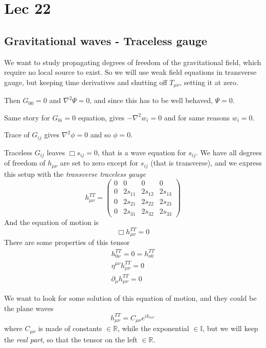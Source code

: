 \section{Lec 22}
\subsection{Gravitational waves - Traceless gauge}
We want to study propagating degrees of freedom of the gravitational field, which require no local source to exist. So we will use weak field equations in transverse gauge, but keeping time derivatives and shutting off $T_{\mu \nu }$, setting it at zero.\par
Then $G_{00} = 0 $ and $\nabla^{2}\Psi  = 0$, and since this has to be well behaved, $\Psi =0$.\par

Same story for $G_{0i} = 0 $ equation, gives $-\nabla ^{2}w_{i} =0$ and for same reasons $w_{i} = 0$.\par
Trace of $G_{ij} $ gives $\nabla ^{2}\phi =0$ and so $\phi =0$.\par
Traceless $G_{ij}$ leaves $\Box s_{ij} = 0$, that is a wave equation for $s_{ij}$. We have all degrees of freedom of $h_{\mu \nu }$ are set to zero except for $s_{ij}$ (that is transverse), and we express this setup with the \emph{transverse traceless gauge}
\[
h_{\mu \nu }^{TT} = \begin{pmatrix}
0 & 0 & 0 & 0 \\
0 & 2s_{11} & 2s_{12} & 2s_{13} \\
0 & 2s_{21} & 2s_{22} & 2s_{23} \\
0 & 2s_{31} & 2s_{32} & 2s_{33}
\end{pmatrix} 
\]
And the equation of motion is 
\[
\Box h_{\mu \nu }^{TT} =0
\]
There are some properties of this tensor
\begin{align}
h_{0 \nu }^{TT} = 0 =  h^{TT}_{\nu 0} \\
\eta ^{\mu \nu } h^{TT}_{\mu \nu } =0\\
\partial_{\mu }h^{TT}_{\mu \nu } = 0
\end{align}

We want to look for some solution of this equation of motion, and they could be the plane waves
\[
h^{TT}_{\mu \nu } = C_{\mu \nu }e^{ik_{\sigma x^{\sigma }}}
\]
where $C_{\mu \nu }$ is made of constants $\in \mathbb{R}$, while the exponential $\in \mathbb{I}$, but we will keep the \emph{real part}, so that the tensor on the left $\in \mathbb{R}$.\par

